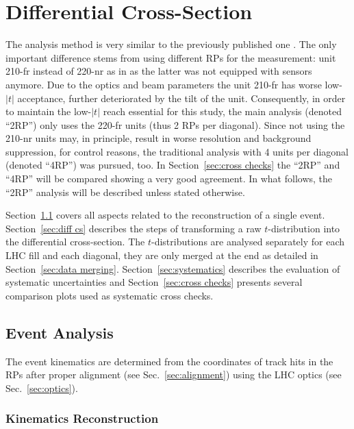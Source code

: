 \section{Differential Cross-Section}
\label{sec:differential cross-section}

The analysis method is very similar to the previously published one \cite{totem-8tev-1km}. The only important difference stems from using different RPs for the measurement: unit 210-fr instead of 220-nr as in \cite{totem-8tev-1km} as the latter was not equipped with sensors anymore. Due to the optics and beam parameters the unit 210-fr has worse low-$|t|$ acceptance, further deteriorated by the tilt of the unit. Consequently, in order to maintain the low-$|t|$ reach essential for this study, the main analysis (denoted ``2RP'') only uses the 220-fr units (thus 2 RPs per diagonal). Since not using the 210-nr units may, in principle, result in worse resolution and background suppression, for control reasons, the traditional analysis with 4 units per diagonal (denoted ``4RP'') was pursued, too. In Section~\ref{sec:cross checks} the ``2RP'' and ``4RP'' will be compared showing a very good agreement. In what follows, the ``2RP'' analysis will be described unless stated otherwise.

Section~\ref{sec:event analysis} covers all aspects related to the reconstruction of a single event. Section~\ref{sec:diff cs} describes the steps of transforming a raw $t$-distribution into the differential cross-section. The $t$-distributions are analysed separately for each LHC fill and each diagonal, they are only merged at the end as detailed in Section~\ref{sec:data merging}. Section~\ref{sec:systematics} describes the evaluation of systematic uncertainties and Section~\ref{sec:cross checks} presents several comparison plots used as systematic cross checks.

\subsection{Event Analysis}
\label{sec:event analysis}

The event kinematics are determined from the coordinates of track hits in the RPs after proper alignment (see Sec.~\ref{sec:alignment}) using the LHC optics (see Sec.~\ref{sec:optics}).


\subsubsection{Kinematics Reconstruction}
\label{sec:kinematics}

